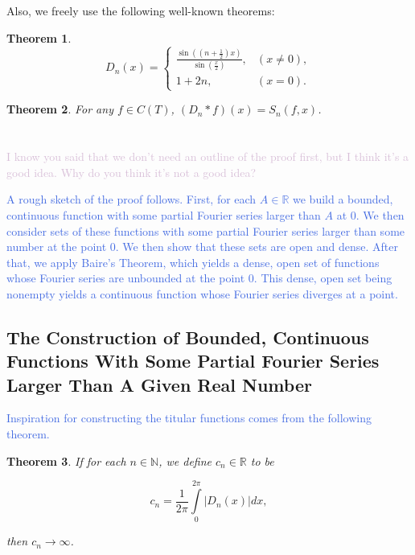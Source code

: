 \documentclass{amsart}
\newcommand{\N}{\mathbb{N}}
\newcommand{\R}{\mathbb{R}}
\newcommand{\colorcomment}[2]{\textcolor{#1}{#2}} %
\newcommand{\absval}[1]{\lvert #1 \rvert}
\newtheorem{thm}{Theorem}[section]
\theoremstyle{definition}
\begin{document}
Also, we freely use the following well-known theorems:

\begin{thm}
\begin{displaymath}
   D_n(x) = \left\{
     \begin{array}{lr}
       \frac{\sin((n+\frac{1}{2})x)}{\sin(\frac{x}{2})}, &(x \neq 0),\\
       1+2n, &(x=0).
     \end{array}
   \right.
\end{displaymath}
\end{thm}

\begin{thm}
For any $f \in C(T)$, $(D_n \ast f)(x) = S_n(f,x)$. 
\end{thm}

\section{}

\colorcomment{Thistle}{I know you said that we don't need an outline of the proof first, but I think it's a good idea. Why do you think it's not a good idea?}

\colorcomment{RoyalBlue}{A rough sketch of the proof follows. 
First, for each $A \in \R$ we build a bounded, continuous function with some partial Fourier series larger than $A$ at $0$. 
We then consider sets of these functions with some partial Fourier series larger than some number at the point $0$.
We then show that these sets are open and dense. 
After that, we apply Baire's Theorem, which yields a dense, open set of functions whose Fourier series are unbounded at the point $0$. 
This dense, open set being nonempty yields a continuous function whose Fourier series diverges at a point.}

\subsection{The Construction of Bounded, Continuous Functions With Some Partial Fourier Series Larger Than A Given Real Number}

\colorcomment{RoyalBlue}{Inspiration for constructing the titular functions comes from the following theorem.}

\begin{thm}
If for each $n \in \N$, we define $c_n \in \R$ to be

\begin{displaymath}
c_n = \frac{1}{2 \pi} \int\limits_0^{2\pi} \absval{D_n(x)} dx,
\end{displaymath}

then $c_n \to \infty$.
\end{thm}
\end{document}
